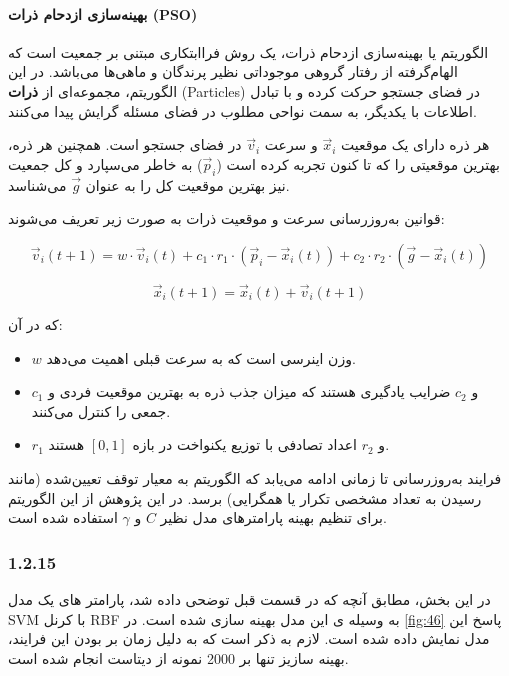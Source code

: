 \documentclass{article}
\begin{document}
\paragraph{بهینه‌سازی ازدحام ذرات (PSO)}

الگوریتم  یا بهینه‌سازی ازدحام ذرات، یک روش فراابتکاری مبتنی بر جمعیت است که الهام‌گرفته از رفتار گروهی موجوداتی نظیر پرندگان و ماهی‌ها می‌باشد. در این الگوریتم، مجموعه‌ای از \textbf{ذرات} (Particles) در فضای جستجو حرکت کرده و با تبادل اطلاعات با یکدیگر، به سمت نواحی مطلوب در فضای مسئله گرایش پیدا می‌کنند.

هر ذره دارای یک موقعیت $\vec{x}_i$ و سرعت $\vec{v}_i$ در فضای جستجو است. همچنین هر ذره، بهترین موقعیتی را که تا کنون تجربه کرده است ($\vec{p}_i$) به خاطر می‌سپارد و کل جمعیت نیز بهترین موقعیت کل را به عنوان $\vec{g}$ می‌شناسد.

قوانین به‌روزرسانی سرعت و موقعیت ذرات به صورت زیر تعریف می‌شوند:

\begin{equation}
	\vec{v}_i(t+1) = w \cdot \vec{v}_i(t) + c_1 \cdot r_1 \cdot (\vec{p}_i - \vec{x}_i(t)) + c_2 \cdot r_2 \cdot (\vec{g} - \vec{x}_i(t))
\end{equation}

\begin{equation}
	\vec{x}_i(t+1) = \vec{x}_i(t) + \vec{v}_i(t+1)
\end{equation}

که در آن:

\begin{itemize}
	\item $w$ وزن اینرسی است که به سرعت قبلی اهمیت می‌دهد.
	\item $c_1$ و $c_2$ ضرایب یادگیری هستند که میزان جذب ذره به بهترین موقعیت فردی و جمعی را کنترل می‌کنند.
	\item $r_1$ و $r_2$ اعداد تصادفی با توزیع یکنواخت در بازه $[0, 1]$ هستند.
\end{itemize}

فرایند به‌روزرسانی تا زمانی ادامه می‌یابد که الگوریتم به معیار توقف تعیین‌شده (مانند رسیدن به تعداد مشخصی تکرار یا همگرایی) برسد. در این پژوهش از این الگوریتم برای تنظیم بهینه پارامترهای مدل  نظیر $C$ و $\gamma$ استفاده شده است.

\subsubsection{1.2.15}
در این بخش، مطابق آنچه که در قسمت قبل توضحی داده شد، پارامتر های یک مدل SVM با کرنل RBF به وسیله ی این مدل بهینه سازی شده است. در \autoref{fig:46} پاسخ این مدل نمایش داده شده است.
لازم به ذکر است که به دلیل زمان بر بودن این فرایند، بهینه سازیز تنها بر 2000 نمونه از دیتاست انجام شده است.
\end{document}
